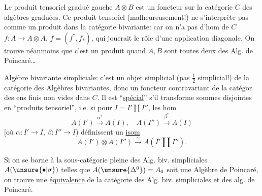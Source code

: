 
Le produit tensoriel gradué gauche $A\otimes B$ est un foncteur sur la catégorie $C$  des algèbres graduées. Ce produit tensoriel (malheureusement!) ne s'interprète pas comme un produit dans la catégorie bivariante: car on n'a pas d'hom de $C$  $f:A\longrightarrow A\otimes A$, $f=(f^*,f_*)$, qui jouerait le rôle d'une application diagonale. On trouve néanmoins que c'est un produit  quand $A,B$ sont toutes deux des Alg. de Poincaré\ldots

Algèbre bivariante simpliciale: c'est un objet simplicial (pas \uline{$\frac12$} simplicial!) de la catégorie des Algèbres bivariantes, donc un foncteur contravariant de la catégor. des ens finis non vides dans $C$. Il est ``\uline{spécial}'' s'il transforme sommes disjointes en ``produits tensoriel'', i.e. si pour $I=I'\amalg I''$, les hom
\[
A(I')\xrightarrow{\alpha^*} A(I),\quad A(I'')\xrightarrow{\beta^*} A(I)
\]
[où $\alpha:I'\longrightarrow I$, $\beta:I''\longrightarrow I$) définissent un \uline{isom}
\[
A(I')\otimes A(I'')\xrightarrow{\sim}A(I'\amalg I'').
\]

Si  on se borne à la sous-catégorie pleine des Alg. biv. simpliciales $A(\unsure{\bullet|\sigma})$ telles que $A(\unsure{\Delta^0})=A_0$ soit une Algèbre de Poincaré, on trouve une \uline{équivalence} de la catégorie des Alg. biv. simpliciales et des alg. de Poincaré.
